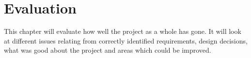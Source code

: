 \chapter{Evaluation}






This chapter will evaluate how well the project as a whole has gone. It will look at different issues relating from correctly identified requirements, design decisions, what was good about the project and areas which could be improved.

